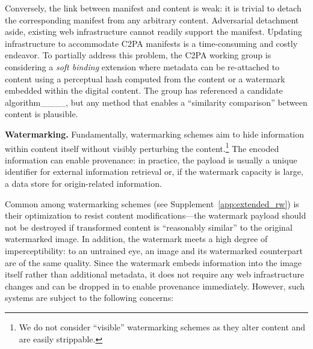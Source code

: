 Conversely, the link between manifest and content is weak: it is trivial to detach the corresponding manifest from any arbitrary content.
Adversarial detachment aside, existing web infrastructure cannot readily support the manifest.
Updating infrastructure to accommodate C2PA manifests is a time-consuming and costly endeavor.
To partially address this problem, the C2PA working group is considering a \textit{soft binding} extension where metadata can be re-attached to content using a perceptual hash computed from the content or a watermark embedded within the digital content.
The group has referenced a candidate algorithm____, but any method that enables a ``similarity comparison'' between content is plausible.

\textbf{Watermarking.}
Fundamentally, watermarking schemes aim to hide information within content itself without visibly perturbing the content.\footnote{We do not consider ``visible'' watermarking schemes as they alter content and are easily strippable.}
The encoded information can enable provenance: in practice, the payload is usually a unique identifier for external information retrieval or, if the watermark capacity is large, a data store for origin-related information.

Common among watermarking schemes (see Supplement~\ref{app:extended_rw}) is their optimization to resist content modifications---the watermark payload should not be destroyed if transformed content is ``reasonably similar'' to the original watermarked image.
In addition, the watermark meets a high degree of imperceptibility: to an untrained eye, an image and its watermarked counterpart are of the same quality.
Since the watermark embeds information into the image itself rather than additional metadata, it does not require any web infrastructure changes and can be dropped in to enable provenance immediately.
However, such systems are subject to the following concerns:

